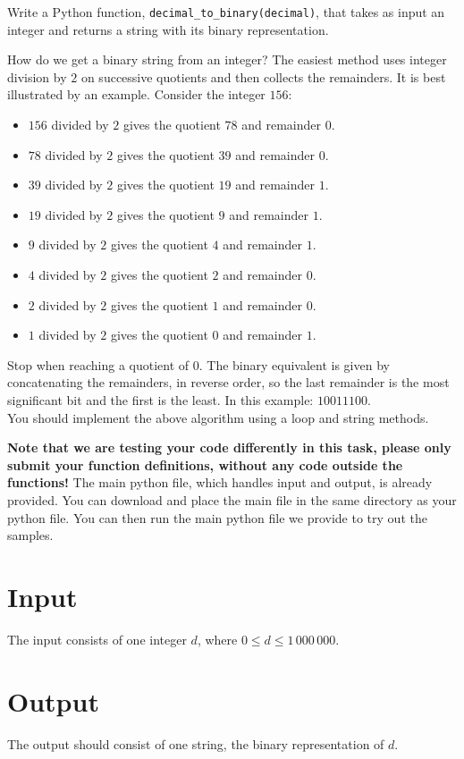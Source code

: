 
Write a Python function, \texttt{decimal\_to\_binary(decimal)},
that takes as input an integer and returns a string with its binary representation.

How do we get a binary string from an integer?
The easiest method uses integer division by $2$ on successive quotients and then collects the remainders.
It is best illustrated by an example. Consider the integer $156$:
\begin{itemize}
    \item $156$ divided by $2$ gives the quotient $78$ and remainder $0$.
    \item $78$ divided by $2$ gives the quotient $39$ and remainder $0$.
    \item $39$ divided by $2$ gives the quotient $19$ and remainder $1$.
    \item $19$ divided by $2$ gives the quotient $9$ and remainder $1$.
    \item $9$ divided by $2$ gives the quotient $4$ and remainder $1$.
    \item $4$ divided by $2$ gives the quotient $2$ and remainder $0$.
    \item $2$ divided by $2$ gives the quotient $1$ and remainder $0$.
    \item $1$ divided by $2$ gives the quotient $0$ and remainder $1$.
\end{itemize}

Stop when reaching a quotient of $0$.
The binary equivalent is given by concatenating the remainders, in reverse order,
so the last remainder is the most significant bit and the first is the least.
In this example: $10011100$.\\
You should implement the above algorithm using a loop and string methods.

\textbf{Note that we are testing your code differently in this task,
please only submit your function definitions, without any code outside the functions!}
The main python file, which handles input and output, is already provided.
You can download and place the main file in the same directory as your python file.
You can then run the main python file we provide to try out the samples.

\section*{Input}
The input consists of one integer $d$, where $0 \leq d \leq 1\,000\,000$.

\section*{Output}
The output should consist of one string, the binary representation of $d$.
